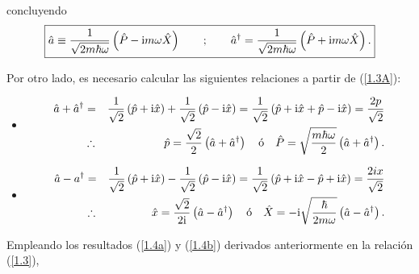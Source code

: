 \begin{solution}
concluyendo
\begin{equation}
\boxed{
\hat{a} \equiv \frac{1}{\sqrt{2m\hbar \omega }}\left( \hat{P}-\mathrm{i} m\omega \hat{X} \right) \qquad ;\qquad \hat{a}^{\dagger }=\frac{1}{\sqrt{2m\hbar \omega }}\left( \hat{P}+\mathrm{i} m\omega \hat{X}\right).}  \label{1.4}
\end{equation}

\noindent
Por otro lado, es necesario calcular las siguientes relaciones a partir de (\ref{1.3A}):

\vspace{0.2cm}
\noindent
\begin{itemize}
\item[$i)$]
\begin{eqnarray}
\hat{a}+\hat{a}^{\dagger } &=& \frac{1}{\sqrt{2}}\left( \hat{p}+\mathrm{i} \hat{x} \right) +\frac{1}{\sqrt{2}}\left( \hat{p}-\mathrm{i} \hat{x} \right) =\frac{1}{\sqrt{2}}\left( \hat{p}+\mathrm{i} \hat{x} +\hat{p} - \mathrm{i} \hat{x} \right) =\frac{2p}{\sqrt{2}}  \notag \\
&\therefore &~\ \hat{p}=\frac{\sqrt{2}}{2}\left( \hat{a}+\hat{a}^{\dagger }\right) \quad \text{ó} \quad  \hat{P} =  \sqrt{\frac{m \hbar \omega}{2}} \left( \hat{a}+\hat{a}^{\dagger} \right).
\label{1.4a}
\end{eqnarray}

\item[$ii)$]
\begin{eqnarray}
\hat{a}-\textbf{}a^{\dagger } &=&\frac{1}{\sqrt{2}}\left( \hat{p}+\mathrm{i} \hat{x} \right) -\frac{1}{\sqrt{2}}\left( \hat{p}-\mathrm{i} \hat{x} \right) =\frac{1}{\sqrt{2}}\left( \hat{p}+\mathrm{i} \hat{x}-\hat{p}+\mathrm{i} \hat{x}\right) =\frac{2ix}{\sqrt{2}}  \notag \\
&\therefore &~\ \hat{x}=\frac{\sqrt{2}}{2\mathrm{i}}\left( \hat{a}-\hat{a}^{\dagger }\right) \quad \text{ó} \quad  \hat{X} = -\mathrm{i} \sqrt{\frac{\hbar}{2m \omega}} \left( \hat{a}-\hat{a}^{\dagger }\right). 
\label{1.4b}
\end{eqnarray}
\end{itemize}

Empleando los resultados (\ref{1.4a}) y (\ref{1.4b}) derivados anteriormente en la relaci\'{o}n (\ref{1.3}),


\end{solution}

